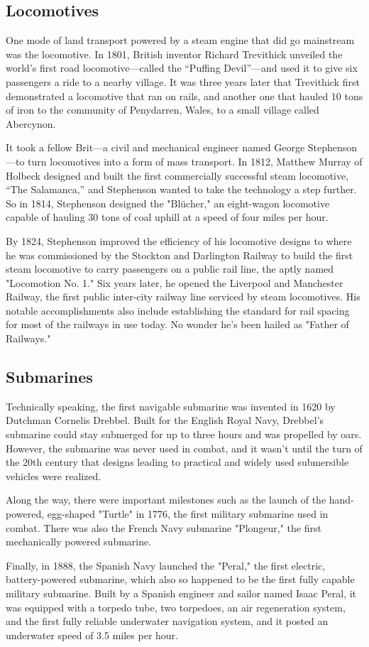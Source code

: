 \subsection*{Locomotives}
\par
One mode of land transport powered by a steam engine that did go mainstream was the locomotive. In 1801, British inventor Richard Trevithick unveiled the world’s first road locomotive—called the “Puffing Devil”—and used it to give six passengers a ride to a nearby village. It was three years later that Trevithick first demonstrated a locomotive that ran on rails, and another one that hauled 10 tons of iron to the community of Penydarren, Wales, to a small village called Abercynon.
\par
It took a fellow Brit—a civil and mechanical engineer named George Stephenson—to turn locomotives into a form of mass transport. In 1812, Matthew Murray of Holbeck designed and built the first commercially successful steam locomotive, “The Salamanca,” and Stephenson wanted to take the technology a step further. So in 1814, Stephenson designed the "Blücher," an eight-wagon locomotive capable of hauling 30 tons of coal uphill at a speed of four miles per hour.
\par
By 1824, Stephenson improved the efficiency of his locomotive designs to where he was commissioned by the Stockton and Darlington Railway to build the first steam locomotive to carry passengers on a public rail line, the aptly named "Locomotion No. 1." Six years later, he opened the Liverpool and Manchester Railway, the first public inter-city railway line serviced by steam locomotives. His notable accomplishments also include establishing the standard for rail spacing for most of the railways in use today. No wonder he’s been hailed as "Father of Railways."
\\
\subsection*{Submarines}
\par
Technically speaking, the first navigable submarine was invented in 1620 by Dutchman Cornelis Drebbel. Built for the English Royal Navy, Drebbel’s submarine could stay submerged for up to three hours and was propelled by oars. However, the submarine was never used in combat, and it wasn’t until the turn of the 20th century that designs leading to practical and widely used submersible vehicles were realized.
\par
Along the way, there were important milestones such as the launch of the hand-powered, egg-shaped "Turtle" in 1776, the first military submarine used in combat. There was also the French Navy submarine "Plongeur," the first mechanically powered submarine.
\par
Finally, in 1888, the Spanish Navy launched the "Peral," the first electric, battery-powered submarine, which also so happened to be the first fully capable military submarine. Built by a Spanish engineer and sailor named Isaac Peral, it was equipped with a torpedo tube, two torpedoes, an air regeneration system, and the first fully reliable underwater navigation system, and it posted an underwater speed of 3.5 miles per hour.
\\
